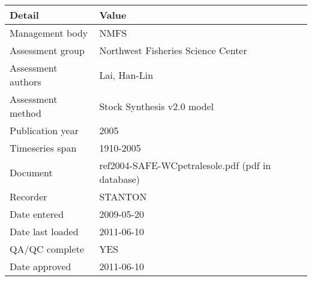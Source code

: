\begin{table}[htb]
\centering
\begin{tabular}{lp{7cm}}
\toprule
Detail & Value \\
\midrule
Management body    & NMFS                                             \\
Assessment group   & Northwest Fisheries Science Center               \\
Assessment authors & Lai, Han-Lin                                     \\
Assessment method  & Stock Synthesis v2.0 model                       \\
Publication year   & 2005                                             \\
Timeseries span    & 1910-2005                                        \\
Document           & ref2004-SAFE-WCpetralesole.pdf (pdf in database) \\
Recorder           & STANTON                                          \\
Date entered       & 2009-05-20                                       \\
Date last loaded   & 2011-06-10                                       \\
QA/QC complete     & YES                                              \\
Date approved      & 2011-06-10                                       \\
\bottomrule
\end{tabular}
\label{tab:assessdet}
\end{table}
